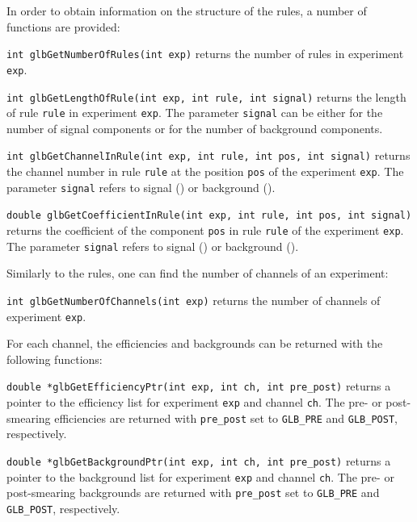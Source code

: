 In order to obtain information on the structure of the rules, 
a number of functions are provided:
\begin{function}
{\tt int glbGetNumberOfRules(int exp)} returns the number of
rules in experiment {\tt exp}.
\end{function}
\begin{function}
{\tt int glbGetLengthOfRule(int exp, int rule, int signal)} returns
the length of rule {\tt rule} in experiment {\tt exp}. The parameter
{\tt signal} can be either  for the number of signal
components or  for the number of background components.
\end{function}
%
\begin{function}
{\tt int glbGetChannelInRule(int exp, int rule, int pos, int signal)}
returns the channel number in rule {\tt rule} at the position {\tt pos}
of the experiment {\tt exp}.
The parameter {\tt signal} refers to signal () or background
().
\end{function}
\begin{function}
{\tt double glbGetCoefficientInRule(int exp, int rule, int pos, int signal)}
returns the coefficient of the component {\tt pos} in rule {\tt rule} 
of the experiment {\tt exp}.
The parameter {\tt signal} refers to signal () or background
().
\end{function}
%
Similarly to the rules, one can find the number of channels of an experiment:
\begin{function}
{\tt int glbGetNumberOfChannels(int exp)} returns the number of 
channels of experiment {\tt exp}.
\end{function} 
For each channel, the efficiencies and backgrounds can be returned with the following functions:
\begin{function}
{\tt double *glbGetEfficiencyPtr(int exp, int ch, int pre\_post)} returns a pointer to
the efficiency list for experiment {\tt exp} and channel {\tt ch}. The pre- or post-smearing
efficiencies are returned with {\tt pre\_post} set to {\tt GLB\_PRE} and {\tt GLB\_POST}, respectively.
\end{function}
\begin{function}
{\tt double *glbGetBackgroundPtr(int exp, int ch, int pre\_post)} returns a pointer to
the background list for experiment {\tt exp} and channel {\tt ch}. The pre- or post-smearing
backgrounds are returned with {\tt pre\_post} set to {\tt GLB\_PRE} and {\tt GLB\_POST}, respectively.
\end{function}

